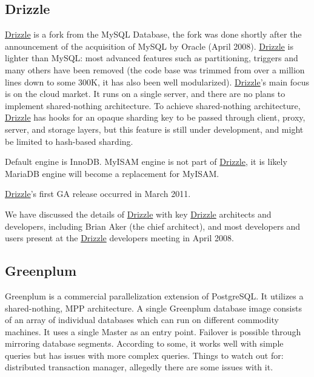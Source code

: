 \documentclass[DM,lsstdraft,toc]{lsstdoc}
\begin{document}
\subsection{Drizzle}\label{drizzle}

\href{http://drizzle.org/}{Drizzle} is a fork from the MySQL Database,
the fork was done shortly after the announcement of the acquisition of
MySQL by Oracle (April 2008). \href{http://drizzle.org/}{Drizzle} is
lighter than MySQL: most advanced features such as partitioning,
triggers and many others have been removed (the code base was trimmed
from over a million lines down to some 300K, it has also been well
modularized). \href{http://drizzle.org/}{Drizzle}'s main focus is on the
cloud market. It runs on a single server, and there are no plans to
implement shared-nothing architecture. To achieve shared-nothing
architecture, \href{http://drizzle.org/}{Drizzle} has hooks for an
opaque sharding key to be passed through client, proxy, server, and
storage layers, but this feature is still under development, and might
be limited to hash-based sharding.

Default engine is InnoDB. MyISAM engine is not part of
\href{http://drizzle.org/}{Drizzle}, it is likely MariaDB engine will
become a replacement for MyISAM.

\href{http://drizzle.org/}{Drizzle}'s first GA release occurred in March
2011.

We have discussed the details of \href{http://drizzle.org/}{Drizzle}
with key \href{http://drizzle.org/}{Drizzle} architects and developers,
including Brian Aker (the chief architect), and most developers and
users present at the \href{http://drizzle.org/}{Drizzle} developers
meeting in April 2008.

\subsection{Greenplum}\label{greenplum}

Greenplum is a commercial parallelization extension of PostgreSQL. It
utilizes a shared-nothing, MPP architecture. A single Greenplum database
image consists of an array of individual databases which can run on
different commodity machines. It uses a single Master as an entry point.
Failover is possible through mirroring database segments. According to
some, it works well with simple queries but has issues with more complex
queries. Things to watch out for: distributed transaction manager,
allegedly there are some issues with it.
\end{document}
